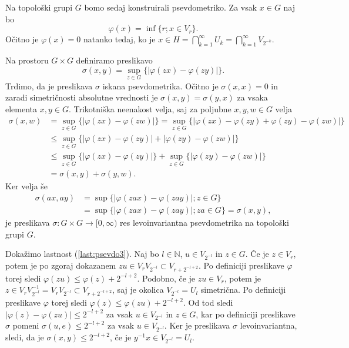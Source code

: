 \documentclass[mat1]{fmfdelo}
\newcommand{\N}{\mathbb N}
\begin{document}
\begin{dokaz}
Na topološki grupi $G$ bomo sedaj konstruirali psevdometriko. Za vsak $x \in G$ naj bo \[\varphi(x) = \inf\lbrace r ; x \in V_r \rbrace.\]
Očitno je $\varphi(x) = 0$ natanko tedaj, ko je $x \in H = \bigcap_{k=1}^{\infty} U_k = \bigcap_{k=1}^{\infty} V_{2^{-k}}$.

Na prostoru $G \times G$ definiramo preslikavo
\[ \sigma(x, y) = \sup_{z \in G}\lbrace |\varphi(zx) - \varphi(zy)| \rbrace. \]
Trdimo, da je preslikava $\sigma$ iskana psevdometrika.
Očitno je $\sigma(x, x) = 0$ in zaradi simetričnosti absolutne vrednosti je $\sigma(x, y) = \sigma(y, x)$ za vsaka elementa $x, y \in G$. Trikotniška neenakost velja, saj za poljubne $x, y, w \in G$ velja
\begin{align*}
\sigma(x, w) &= \sup_{z \in G}\lbrace |\varphi(zx) - \varphi(zw)| \rbrace 
= \sup_{z \in G}\lbrace |\varphi(zx) - \varphi(zy) + \varphi(zy) - \varphi(zw)| \rbrace \\
&\leq \sup_{z \in G}\lbrace |\varphi(zx) - \varphi(zy)| + |\varphi(zy) - \varphi(zw)| \rbrace \\
&\leq \sup_{z \in G}\lbrace |\varphi(zx) - \varphi(zy)| \rbrace + \sup_{z \in G}\lbrace |\varphi(zy) - \varphi(zw)| \rbrace \\
&= \sigma(x, y) + \sigma(y, w).
\end{align*}
Ker velja še
\begin{align*}
\sigma(ax, ay) &= \sup\lbrace |\varphi(zax) - \varphi(zay)| ; z \in G \rbrace \\
&= \sup\lbrace |\varphi(zax) - \varphi(zay)| ; za \in G \rbrace = \sigma(x, y),
\end{align*}
je preslikava $\sigma\colon G \times G \to [0, \infty)$ res levoinvariantna psevdometrika na topološki grupi $G$.

Dokažimo lastnost (\ref{last:psevdo3}). Naj bo $l \in \N$, $u \in V_{2^{-l}}$ in $z \in G$. Če je $z \in V_r$, potem je po zgoraj dokazanem $zu \in V_rV_{2^{-l}} \subset V_{r + 2^{-l+2}}$. Po definiciji preslikave $\varphi$ torej sledi $\varphi(zu) \leq \varphi(z) + 2^{-l+2}$. Podobno, če je $zu \in V_r$, potem je $z \in V_rV_{2^{-l}}^{-1} = V_rV_{2^{-l}} \subset V_{r + 2^{-l+2}}$, saj je okolica $V_{2^{-l}} = U_l$ simetrična. Po definiciji preslikave $\varphi$ torej sledi $\varphi(z) \leq \varphi(zu) + 2^{-l+2}$. Od tod sledi $|\varphi(z) - \varphi(zu)| \leq 2^{-l+2}$ za vsak $u \in V_{2^{-l}}$ in $z \in G$, kar po definiciji preslikave $\sigma$ pomeni $\sigma(u, e) \leq 2^{-l+2}$ za vsak $u \in V_{2^{-l}}$. Ker je preslikava $\sigma$ levoinvariantna, sledi, da je $\sigma(x, y) \leq 2^{-l+2}$, če je $y^{-1}x \in V_{2^{-l}} = U_l$.


\end{dokaz}
\end{document}
